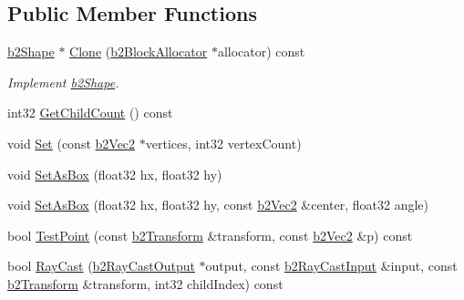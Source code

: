 \subsection*{Public Member Functions}
\begin{DoxyCompactItemize}
\item 
\hypertarget{classb2_polygon_shape_a38cf6a915a85691746465c9dbfc5aeb6}{\hyperlink{classb2_shape}{b2\-Shape} $\ast$ \hyperlink{classb2_polygon_shape_a38cf6a915a85691746465c9dbfc5aeb6}{Clone} (\hyperlink{classb2_block_allocator}{b2\-Block\-Allocator} $\ast$allocator) const }\label{classb2_polygon_shape_a38cf6a915a85691746465c9dbfc5aeb6}

\begin{DoxyCompactList}\small\item\em Implement \hyperlink{classb2_shape}{b2\-Shape}. \end{DoxyCompactList}\item 
int32 \hyperlink{classb2_polygon_shape_ae844375297d19744e01a37b397a5baba}{Get\-Child\-Count} () const 
\item 
void \hyperlink{classb2_polygon_shape_a8aa13a7584b58f08be4d84181b5a86a8}{Set} (const \hyperlink{structb2_vec2}{b2\-Vec2} $\ast$vertices, int32 vertex\-Count)
\item 
void \hyperlink{classb2_polygon_shape_a6bb90df8b4a40d1c53b64cc352a855dd}{Set\-As\-Box} (float32 hx, float32 hy)
\item 
void \hyperlink{classb2_polygon_shape_a890690250115483da6c7d69829be087e}{Set\-As\-Box} (float32 hx, float32 hy, const \hyperlink{structb2_vec2}{b2\-Vec2} \&center, float32 angle)
\item 
bool \hyperlink{classb2_polygon_shape_a69ccc2f671394b3cc1a00a16ef36b12b}{Test\-Point} (const \hyperlink{structb2_transform}{b2\-Transform} \&transform, const \hyperlink{structb2_vec2}{b2\-Vec2} \&p) const 
\item 
\hypertarget{classb2_polygon_shape_ac13bded10d09c341f64aaa2750dda6b5}{bool \hyperlink{classb2_polygon_shape_ac13bded10d09c341f64aaa2750dda6b5}{Ray\-Cast} (\hyperlink{structb2_ray_cast_output}{b2\-Ray\-Cast\-Output} $\ast$output, const \hyperlink{structb2_ray_cast_input}{b2\-Ray\-Cast\-Input} \&input, const \hyperlink{structb2_transform}{b2\-Transform} \&transform, int32 child\-Index) const }\label{classb2_polygon_shape_ac13bded10d09c341f64aaa2750dda6b5}


\end{DoxyCompactItemize}
